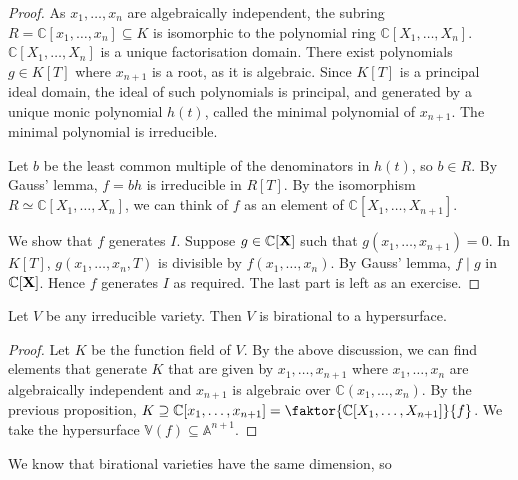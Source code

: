 \begin{proof}
    As \( x_1, \dots, x_n \) are algebraically independent, the subring \( R = \mathbb C[x_1, \dots, x_n] \subseteq K \) is isomorphic to the polynomial ring \( \mathbb C[X_1, \dots, X_n] \).
    \( \mathbb C[X_1, \dots, X_n] \) is a unique factorisation domain.
    There exist polynomials \( g \in K[T] \) where \( x_{n+1} \) is a root, as it is algebraic.
    Since \( K[T] \) is a principal ideal domain, the ideal of such polynomials is principal, and generated by a unique monic polynomial \( h(t) \), called the minimal polynomial of \( x_{n+1} \).
    The minimal polynomial is irreducible.

    Let \( b \) be the least common multiple of the denominators in \( h(t) \), so \( b \in R \).
    By Gauss' lemma, \( f = bh \) is irreducible in \( R[T] \).
    By the isomorphism \( R \simeq \mathbb C[X_1, \dots, X_n] \), we can think of \( f \) as an element of \( \mathbb C[X_1, \dots, X_{n+1}] \).

    We show that \( f \) generates \( I \).
    Suppose \( g \in \mathbb C[\vb X] \) such that \( g(x_1, \dots, x_{n+1}) = 0 \).
    In \( K[T] \), \( g(x_1, \dots, x_n, T) \) is divisible by \( f(x_1, \dots, x_n) \).
    By Gauss' lemma, \( f \mid g \) in \( \mathbb C[\vb X] \).
    Hence \( f \) generates \( I \) as required.
    The last part is left as an exercise.
\end{proof}
\begin{corollary}
    Let \( V \) be any irreducible variety.
    Then \( V \) is birational to a hypersurface.
\end{corollary}
\begin{proof}
    Let \( K \) be the function field of \( V \).
    By the above discussion, we can find elements that generate \( K \) that are given by \( x_1, \dots, x_{n+1} \) where \( x_1, \dots, x_n \) are algebraically independent and \( x_{n+1} \) is algebraic over \( \mathbb C(x_1, \dots, x_n) \).
    By the previous proposition, \( K \supseteq \mathbb C[x_1, \dots, x_{n+1}] = \faktor{\mathbb C[X_1, \dots, X_{n+1}]}{f} \).
    We take the hypersurface \( \mathbb V(f) \subseteq \mathbb A^{n+1} \).
\end{proof}
We know that birational varieties have the same dimension, so %

